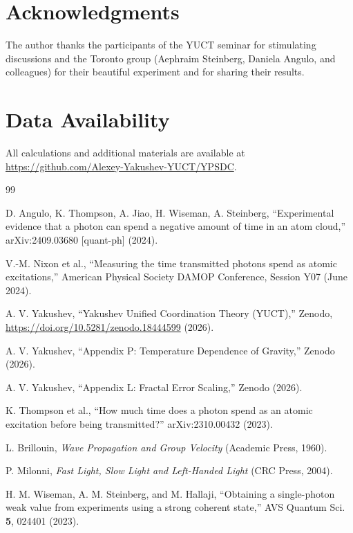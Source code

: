 \documentclass[12pt,a4paper]{article}
\begin{document}
	\section*{Acknowledgments}
	
	The author thanks the participants of the YUCT seminar for stimulating discussions and the Toronto group (Aephraim Steinberg, Daniela Angulo, and colleagues) for their beautiful experiment and for sharing their results.
	
	\section*{Data Availability}
	
	All calculations and additional materials are available at \url{https://github.com/Alexey-Yakushev-YUCT/YPSDC}.
	
	\begin{thebibliography}{99}
		
		D. Angulo, K. Thompson, A. Jiao, H. Wiseman, A. Steinberg, ``Experimental evidence that a photon can spend a negative amount of time in an atom cloud,'' arXiv:2409.03680 [quant-ph] (2024).
		
		V.-M. Nixon et al., ``Measuring the time transmitted photons spend as atomic excitations,'' American Physical Society DAMOP Conference, Session Y07 (June 2024).
		
		A. V. Yakushev, ``Yakushev Unified Coordination Theory (YUCT),'' Zenodo, \url{https://doi.org/10.5281/zenodo.18444599} (2026).
		
		A. V. Yakushev, ``Appendix P: Temperature Dependence of Gravity,'' Zenodo (2026).
		
		A. V. Yakushev, ``Appendix L: Fractal Error Scaling,'' Zenodo (2026).
		
		K. Thompson et al., ``How much time does a photon spend as an atomic excitation before being transmitted?'' arXiv:2310.00432 (2023).
		
		L. Brillouin, \textit{Wave Propagation and Group Velocity} (Academic Press, 1960).
		
		P. Milonni, \textit{Fast Light, Slow Light and Left-Handed Light} (CRC Press, 2004).
		
		H. M. Wiseman, A. M. Steinberg, and M. Hallaji, ``Obtaining a single-photon weak value from experiments using a strong coherent state,'' AVS Quantum Sci. \textbf{5}, 024401 (2023).
		
	\end{thebibliography}
	
\end{document}
